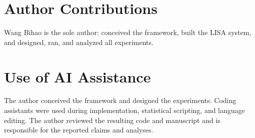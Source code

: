 \documentclass[11pt]{article}
\begin{document}
\section*{Author Contributions}
Wang Bihao is the sole author: conceived the framework, built the LISA system, and designed, ran, and analyzed all experiments.

\section*{Use of AI Assistance}
The author conceived the framework and designed the experiments. Coding assistants were used during implementation, statistical scripting, and language editing. The author reviewed the resulting code and manuscript and is responsible for the reported claims and analyses.
\end{document}
